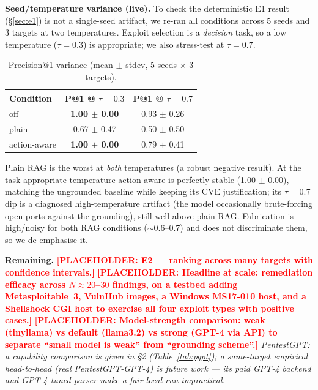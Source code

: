 \documentclass[conference]{IEEEtran}
\newcommand{\todo}[1]{\textcolor{red}{\textbf{[PLACEHOLDER: #1]}}}
\begin{document}
\noindent\textbf{Seed/temperature variance (live).} To check the deterministic
E1 result (\S\ref{sec:e1}) is not a single-seed artifact, we re-ran all
conditions across 5 seeds and 3 targets at two temperatures. Exploit selection is
a \emph{decision} task, so a low temperature ($\tau{=}0.3$) is appropriate; we
also stress-test at $\tau{=}0.7$.

\begin{table}[h]
\caption{Precision@1 variance (mean $\pm$ stdev, 5 seeds $\times$ 3 targets).}
\centering
\begin{tabular}{lcc}
\toprule
Condition & P@1 @ $\tau{=}0.3$ & P@1 @ $\tau{=}0.7$ \\
\midrule
off          & \textbf{1.00 $\pm$ 0.00} & 0.93 $\pm$ 0.26 \\
plain        & 0.67 $\pm$ 0.47 & 0.50 $\pm$ 0.50 \\
action-aware & \textbf{1.00 $\pm$ 0.00} & 0.79 $\pm$ 0.41 \\
\bottomrule
\end{tabular}
\end{table}

\noindent Plain RAG is the worst at \emph{both} temperatures (a robust negative
result). At the task-appropriate temperature action-aware is perfectly stable
(1.00 $\pm$ 0.00), matching the ungrounded baseline while keeping its CVE
justification; its $\tau{=}0.7$ dip is a diagnosed high-temperature artifact (the
model occasionally brute-forcing open ports against the grounding), still well
above plain RAG. Fabrication is high/noisy for both RAG conditions
($\sim$0.6--0.7) and does not discriminate them, so we de-emphasise it.

\medskip
\noindent\textbf{Remaining.}
\todo{E2 --- ranking across many targets with confidence intervals.}
\todo{Headline at scale: remediation efficacy across $N\approx20$--$30$ findings,
on a testbed adding Metasploitable~3, VulnHub images, a Windows MS17-010 host, and
a Shellshock CGI host to exercise all four exploit types with positive cases.}
\todo{Model-strength comparison: weak (tinyllama) vs default (llama3.2) vs strong
(GPT-4 via API) to separate ``small model is weak'' from ``grounding scheme''.}
\textit{PentestGPT: a capability comparison is given in \S2
(Table~\ref{tab:pgpt}); a same-target empirical head-to-head (real
PentestGPT-GPT-4) is future work --- its paid GPT-4 backend and GPT-4-tuned parser
make a fair local run impractical.}

\end{document}
